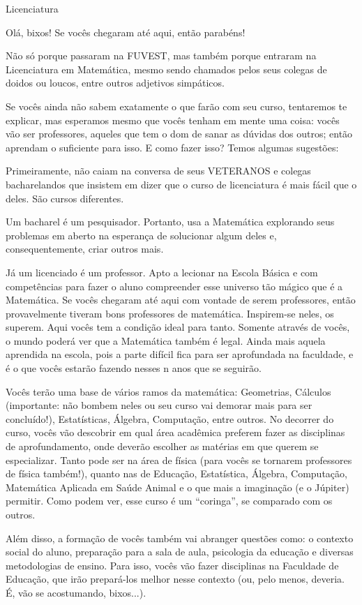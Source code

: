 \begin{subsecao}{Licenciatura}

Olá, bixos! Se vocês chegaram até aqui, então parabéns!

Não só porque passaram na FUVEST, mas também porque entraram na Licenciatura em
Matemática, mesmo sendo chamados pelos seus colegas de doidos ou loucos, entre
outros adjetivos simpáticos.

Se vocês ainda não sabem exatamente o que farão com seu curso, tentaremos te
explicar, mas esperamos mesmo que vocês tenham em mente uma coisa: vocês vão ser
professores, aqueles que tem o dom de sanar as dúvidas dos outros; então
aprendam o suficiente para isso. E como fazer isso? Temos algumas sugestões:

Primeiramente, não caiam na conversa de seus VETERANOS e colegas bacharelandos
que insistem em dizer que o curso de licenciatura é mais fácil que o deles. São
cursos diferentes.

Um bacharel é um pesquisador. Portanto, usa a Matemática explorando seus
problemas em aberto na esperança de solucionar algum deles e, consequentemente,
criar outros mais.

Já um licenciado é um professor. Apto a lecionar na Escola Básica e com
competências para fazer o aluno compreender esse universo tão mágico que é a
Matemática. Se vocês chegaram até aqui com vontade de serem professores, então
provavelmente tiveram bons professores de matemática. Inspirem-se neles,
os superem.  Aqui vocês tem a condição ideal para tanto. Somente através de
vocês, o mundo poderá ver que a Matemática também é legal. Ainda mais aquela
aprendida na escola, pois a parte difícil fica para ser aprofundada na
faculdade, e é o que vocês estarão fazendo nesses n anos que se seguirão.

Vocês terão uma base de vários ramos da matemática: Geometrias, Cálculos
(importante: não bombem neles ou seu curso vai demorar mais para ser
concluído!), Estatísticas, Álgebra, Computação, entre outros. No decorrer do
curso, vocês vão descobrir em qual área acadêmica preferem fazer as disciplinas
de aprofundamento, onde deverão escolher as matérias em que querem se
especializar. Tanto pode ser na área de física (para vocês se tornarem
professores de física também!), quanto nas de Educação, Estatística, Álgebra,
Computação, Matemática Aplicada em Saúde Animal e o que mais a imaginação (e o
Júpiter) permitir. Como podem ver, esse curso é um ``coringa'', se comparado com
os outros.

Além disso, a formação de vocês também vai abranger questões como: o contexto
social do aluno, preparação para a sala de aula, psicologia da educação e
diversas metodologias de ensino. Para isso, vocês vão fazer disciplinas na
Faculdade de Educação, que irão prepará-los melhor nesse contexto (ou, pelo
menos, deveria. É, vão se acostumando, bixos...).


\end{subsecao}
